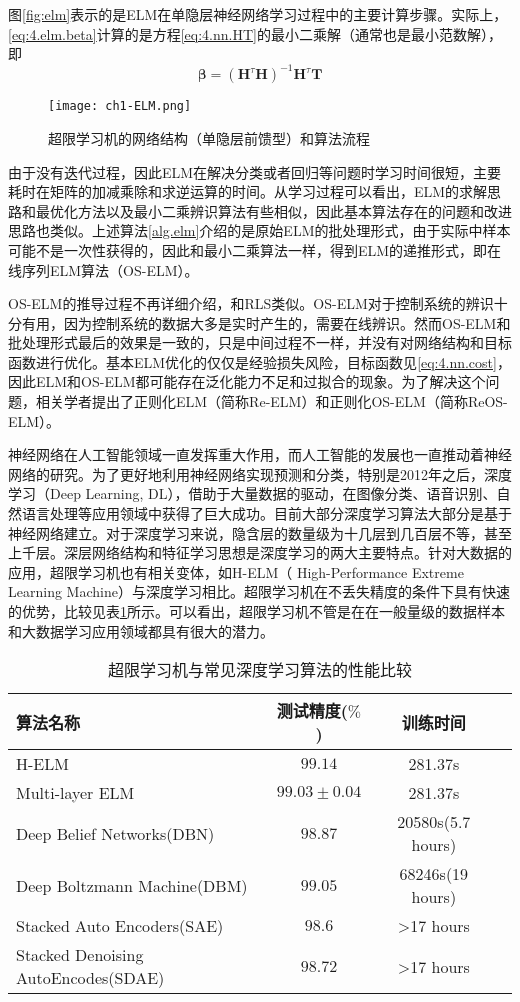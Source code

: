 图\eqref{fig:elm}表示的是ELM在单隐层神经网络学习过程中的主要计算步骤。实际上，\eqref{eq:4.elm.beta}计算的是方程\eqref{eq:4.nn.HT}的最小二乘解（通常也是最小范数解），即
\begin{equation}
\bm{\beta}=(\bm{H}^{\tau}\bm{H})^{-1}\bm{H}^{\tau}\bm{T} 
\end{equation}

\begin{figure}
 \centering
 \texttt{[image: ch1-ELM.png]}
 \caption{超限学习机的网络结构（单隐层前馈型）和算法流程}\label{fig:elm}
\end{figure}

由于没有迭代过程，因此ELM在解决分类或者回归等问题时学习时间很短，主要耗时在矩阵的加减乘除和求逆运算的时间。从学习过程可以看出，ELM的求解思路和最优化方法以及最小二乘辨识算法有些相似，因此基本算法存在的问题和改进思路也类似。上述算法\ref{alg.elm}介绍的是原始ELM的批处理形式，由于实际中样本可能不是一次性获得的，因此和最小二乘算法一样，得到ELM的递推形式，即在线序列ELM算法（OS-ELM）。

OS-ELM的推导过程不再详细介绍，和RLS类似。OS-ELM对于控制系统的辨识十分有用，因为控制系统的数据大多是实时产生的，需要在线辨识。然而OS-ELM和批处理形式最后的效果是一致的，只是中间过程不一样，并没有对网络结构和目标函数进行优化。基本ELM优化的仅仅是经验损失风险，目标函数见\eqref{eq:4.nn.cost}，因此ELM和OS-ELM都可能存在泛化能力不足和过拟合的现象。为了解决这个问题，相关学者提出了正则化ELM（简称Re-ELM）和正则化OS-ELM（简称ReOS-ELM）。

神经网络在人工智能领域一直发挥重大作用，而人工智能的发展也一直推动着神经网络的研究。为了更好地利用神经网络实现预测和分类，特别是2012年之后，深度学习（Deep Learning, DL），借助于大量数据的驱动，在图像分类、语音识别、自然语言处理等应用领域中获得了巨大成功。目前大部分深度学习算法大部分是基于神经网络建立。对于深度学习来说，隐含层的数量级为十几层到几百层不等，甚至上千层。深层网络结构和特征学习思想是深度学习的两大主要特点。针对大数据的应用，超限学习机也有相关变体，如H-ELM（
High-Performance Extreme Learning Machine）与深度学习相比。超限学习机在不丢失精度的条件下具有快速的优势，比较见表\ref{tab:elm-dl}所示。可以看出，超限学习机不管是在在一般量级的数据样本和大数据学习应用领域都具有很大的潜力。
\begin{table}
\centering
\caption{超限学习机与常见深度学习算法的性能比较}\label{tab:elm-dl}
\begin{tabular*}{0.9\textwidth}{@{\extracolsep{\fill}}lccc}
\toprule
算法名称	&测试精度($\%$)	&训练时间 \\
\midrule
H-ELM	&$99.14$	&281.37s\\
Multi-layer ELM	&$99.03\pm0.04$	&281.37s\\
Deep Belief Networks(DBN)	&$98.87$	&20580s(5.7 hours)\\
Deep Boltzmann Machine(DBM)	&$99.05$	&68246s(19 hours)\\
Stacked Auto Encoders(SAE)	&$98.6$	&>17 hours\\
Stacked Denoising AutoEncodes(SDAE)	&$98.72$	&>17 hours\\
\bottomrule
\end{tabular*}
\end{table}

